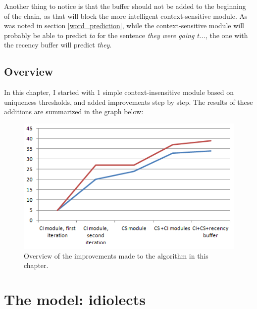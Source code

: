 \documentclass[12pt]{article}
\let\stdsection\section
\renewcommand\section{\newpage\stdsection}
\begin{document}
Another thing to notice is that the buffer should not be added to the beginning of the chain, as that will block the more intelligent context-sensitive module. As was noted in section \ref{word_prediction}, while the context-sensitive module will probably be able to predict \emph{to} for the sentence \emph{they were going t...}, the one with the recency buffer will predict \emph{they}.

\subsection{Overview}
In this chapter, I started with 1 simple context-insensitive module based on uniqueness thresholds, and added improvements step by step. The results of these additions are summarized in the graph below:

\begin{figure}[H] \centering
\includegraphics[scale=1]{overview}
\caption{Overview of the improvements made to the algorithm in this chapter.}
\label{overview}
\end{figure} 






\section{The model: idiolects} \label{model}
\end{document}
